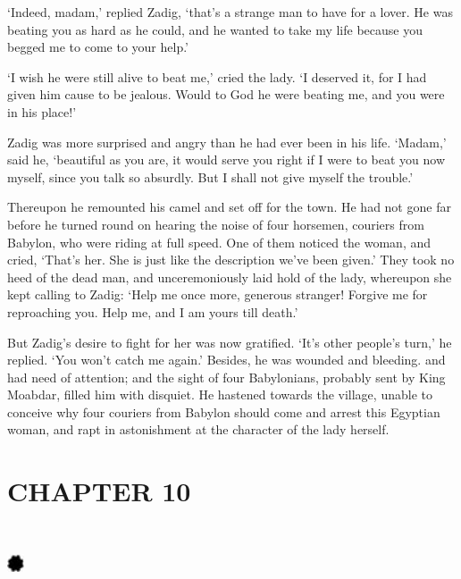 \documentclass{article}
\begin{document}
\begin{center}
`Indeed, madam,' replied Zadig, `that's a strange man to have for a lover. He was 
beating you as hard as he could, and he wanted to take my life because you begged 
me to come to your help.' 

`I wish he were still alive to beat me,' cried the lady. `I deserved it, for I 
had given him cause to be jealous. Would to God he were beating me, and you were 
in his place!' 

Zadig was more surprised and angry than he had ever been in his life. `Madam,' 
said he, `beautiful as you are, it would serve you right if I were to beat you 
now myself, since you talk so absurdly. But I shall not give myself the trouble.' 

Thereupon he remounted his camel and set off for the town. He had not gone far 
before he turned round on hearing the noise of four horsemen, couriers from Babylon, 
who were riding at full speed. One of them noticed the woman, and cried, `That's 
her. She is just like the description we've been given.' They took no heed of the 
dead man, and unceremoniously laid hold of the lady, whereupon she kept calling 
to Zadig: `Help me once more, generous stranger! Forgive me for reproaching you. 
Help me, and I am yours till death.' 

But Zadig's desire to fight for her was now gratified. `It's other people's turn,' 
he replied. `You won't catch me again.' Besides, he was wounded and bleeding. and 
had need of attention; and the sight of four Babylonians, probably sent by King 
Moabdar, filled him with disquiet. He hastened towards the village, unable to conceive 
why four couriers from Babylon should come and arrest this Egyptian woman, and 
rapt in astonishment at the character of the lady herself.\pagebreak{} 

\section*{\textbf{CHAPTER 10  }}

\section*{%
\includegraphics[width=14pt, height=15pt, keepaspectratio=true]{Zadig or L'Ingenu - Voltaire-fig013.jpg}
}


\end{center}
\end{document}
